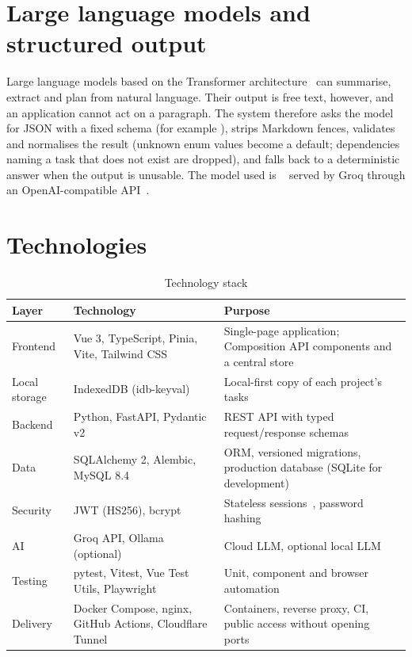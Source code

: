 \documentclass[../main.tex]{subfiles}
\begin{document}
\section{Large language models and structured output}
Large language models based on the Transformer architecture~\cite{vaswani2017attention} can
summarise, extract and plan from natural language. Their output is free text, however, and an
application cannot act on a paragraph. The system therefore asks the model for JSON with a fixed schema
(for example ), strips Markdown fences, validates and
normalises the result (unknown enum values become a default; dependencies naming a task that does not
exist are dropped), and falls back to a deterministic answer when the output is unusable. The model
used is ~\cite{openai2025gptoss} served by Groq through an
OpenAI-compatible API~\cite{groqdocs}.

\section{Technologies}
\begin{table}[H]
\centering
\caption{Technology stack}\label{tab:stack}
\renewcommand{\arraystretch}{1.25}
\begin{tabular}{|p{3.2cm}|p{4.2cm}|p{6.3cm}|}
\hline
\textbf{Layer} & \textbf{Technology} & \textbf{Purpose} \\ \hline
Frontend & Vue 3, TypeScript, Pinia, Vite, Tailwind CSS & Single-page application; Composition API components and a central store~\cite{vuejs} \\ \hline
Local storage & IndexedDB (idb-keyval) & Local-first copy of each project's tasks \\ \hline
Backend & Python, FastAPI, Pydantic v2 & REST API with typed request/response schemas~\cite{fastapi} \\ \hline
Data & SQLAlchemy 2, Alembic, MySQL 8.4 & ORM, versioned migrations, production database (SQLite for development) \\ \hline
Security & JWT (HS256), bcrypt & Stateless sessions~\cite{rfc7519jwt}, password hashing \\ \hline
AI & Groq API, Ollama (optional) & Cloud LLM, optional local LLM \\ \hline
Testing & pytest, Vitest, Vue Test Utils, Playwright & Unit, component and browser automation \\ \hline
Delivery & Docker Compose, nginx, GitHub Actions, Cloudflare Tunnel & Containers, reverse proxy, CI, public access without opening ports~\cite{cloudflaretunnel} \\ \hline
\end{tabular}
\end{table}
\end{document}
